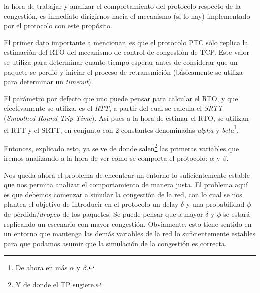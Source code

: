  la hora de trabajar y analizar el comportamiento del
protocolo respecto de la congesti\'on, es inmediato dirigirnos hacia el
mecanismo (si lo hay) implementado por el protocolo con este prop\'osito.

\par El primer dato importante a mencionar, es que el protocolo PTC s\'olo
replica la estimaci\'on del RTO del mecanismo de control de congesti\'on de
TCP\cite{rfc5681}.  Este valor se utiliza para determinar cuanto tiempo esperar
antes de considerar que un paquete se perdi\'o y iniciar el proceso de
retransmici\'on (b\'asicamente se utiliza para determinar un \textit{timeout}).

\par El par\'ametro por defecto que uno puede pensar para calcular el RTO, y
que efectivamente se utiliza, es el
\textit{RTT}\cite{rfc1323}\cite{karns_algorithm}\cite{rfc6298}, a partir del
cual se calcula el \textit{SRTT} (\textit{Smoothed Round Trip
Time}\cite{rfc6298}). As\'i pues a la hora de estimar el RTO, se utilizan el
RTT y el SRTT, en conjunto con 2 constantes denominadas \emph{alpha} y
\emph{beta}\footnote{De ahora en m\'as $\alpha$ y $\beta$.}\cite{rfc6298}.

\par Entonces, explicado esto, ya se ve de donde salen\footnote{Y de donde el
TP sugiere.} las primeras variables que iremos analizando a la hora de ver como
se comporta el protocolo: $\alpha$ y $\beta$.

\par Nos queda ahora el problema de encontrar un entorno lo suficientemente
estable que nos permita analizar el comportamiento de manera justa. El problema
aqu\'i es que debemos comenzar a simular la congesti\'on de la red, con lo cual
se nos plantea el objetivo de introducir en el protocolo un delay $\delta$ y
una probabilidad $\phi$ de p\'erdida/$dropeo$ de los paquetes.  Se puede pensar
que a mayor $\delta$ y $\phi$ se estar\'a replicando un escenario con mayor
congesti\'on. Obviamente, esto tiene sentido en un entorno que mantenga las
dem\'as variables de la red lo suficientemente estables para que podamos asumir
que la simulaci\'on de la congesti\'on es correcta.

